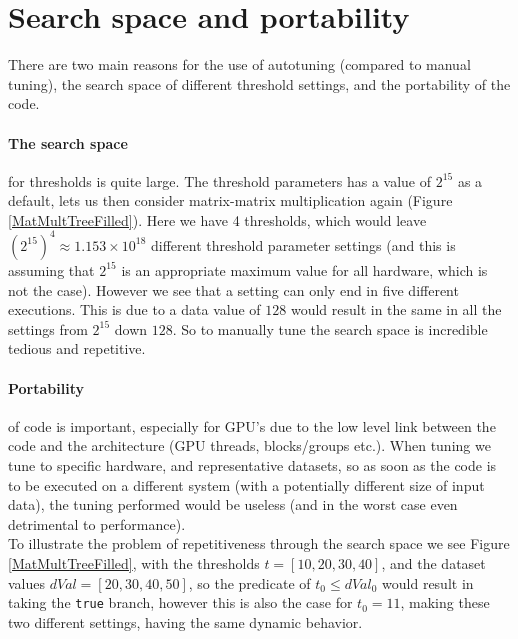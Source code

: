 \section{Search space and portability}
There are two main reasons for the use of autotuning (compared to manual tuning), the search space of different threshold settings, and the portability of the code.
\paragraph{The search space} for thresholds is quite large. The threshold parameters has a value of $2^{15}$ as a default, lets us then consider matrix-matrix multiplication again (Figure \ref{MatMultTreeFilled}). Here we have 4 thresholds, which would leave $(2^{15})^4 \approx 1.153\times10^{18}$ different threshold parameter settings (and this is assuming that $2^{15}$ is an appropriate maximum value for all hardware, which is not the case). However we see that a setting can only end in five different executions. This is due to a data value of $128$ would result in the same in all the settings from $2^{15}$ down $128$. So to manually tune the search space is incredible tedious and repetitive.
\paragraph{Portability} of code is important, especially for GPU's due to the low level link between the code and the architecture (GPU threads, blocks/groups etc.). When tuning we tune to specific hardware, and representative datasets, so as soon as the code is to be executed on a different system (with a potentially different size of input data), the tuning performed would be useless (and in the worst case even detrimental to performance).\\

To illustrate the problem of repetitiveness through the search space we see Figure \ref{MatMultTreeFilled}, with the thresholds $t = [10, 20, 30, 40]$, and the dataset values $dVal = [20, 30, 40, 50]$, so the predicate of $t_0 \leq dVal_0$ would result in taking the \texttt{true} branch, however this is also the case for $t_0 = 11$, making these two different settings, having the same dynamic behavior.